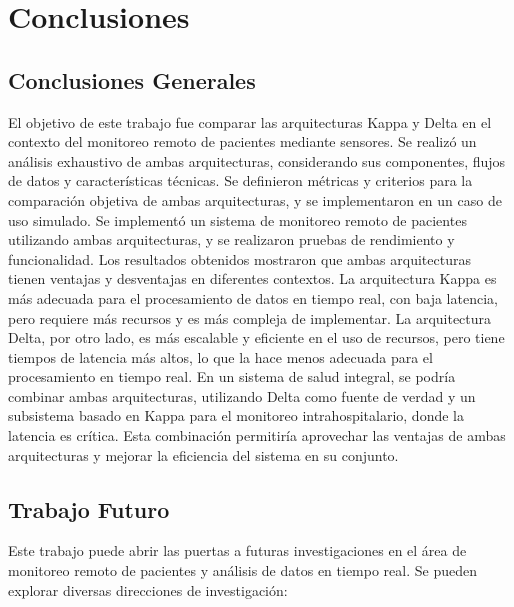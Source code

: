 \chapter{Conclusiones}

\section{Conclusiones Generales}

El objetivo de este trabajo fue comparar las arquitecturas Kappa y Delta en el contexto del monitoreo remoto de pacientes mediante sensores.
Se realizó un análisis exhaustivo de ambas arquitecturas, considerando sus componentes, flujos de datos y características técnicas.
Se definieron métricas y criterios para la comparación objetiva de ambas arquitecturas, y se implementaron en un caso de uso simulado.
Se implementó un sistema de monitoreo remoto de pacientes utilizando ambas arquitecturas, y se realizaron pruebas de rendimiento y funcionalidad.
Los resultados obtenidos mostraron que ambas arquitecturas tienen ventajas y desventajas en diferentes contextos.
La arquitectura Kappa es más adecuada para el procesamiento de datos en tiempo real, con baja latencia, pero requiere más recursos y es más compleja de implementar.
La arquitectura Delta, por otro lado, es más escalable y eficiente en el uso de recursos, pero tiene tiempos de latencia más altos, lo que la hace menos adecuada para el procesamiento en tiempo real.
En un sistema de salud integral, se podría combinar ambas arquitecturas, utilizando Delta como fuente de verdad y un subsistema basado en Kappa para el monitoreo intrahospitalario, donde la latencia es crítica.
Esta combinación permitiría aprovechar las ventajas de ambas arquitecturas y mejorar la eficiencia del sistema en su conjunto.
\newpage
\section{Trabajo Futuro}

Este trabajo puede abrir las puertas a futuras investigaciones en el área de monitoreo remoto de pacientes y análisis de datos en tiempo real.
Se pueden explorar diversas direcciones de investigación:

